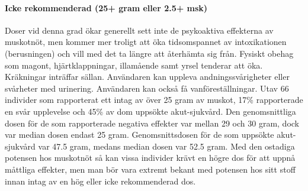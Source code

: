 \paragraph{Icke rekommenderad (25+ gram eller 2.5+ msk)}
Doser vid denna grad ökar generellt sett inte de psykoaktiva effekterna av muskotnöt, men kommer mer troligt att öka tidsomspannet av intoxikationen (berusningen) och vill med det ta längre att återhämta sig från.
Fysiskt obehag som magont, hjärtklappningar, illamående samt yrsel tenderar att öka.
Kräkningar inträffar sällan.
Användaren kan uppleva andningssvårigheter eller svårheter med urinering. Användaren kan också få vanföreställningar.
Utav 66 individer som rapporterat ett intag av över 25 gram av muskot, 17\% rapporterade en svår upplevelse och 45\% av dom uppsökte akut-sjukvård.
Den genomsnittliga dosen för de som rapporterade negativa effekter var mellan 29 och 30 gram, dock var median dosen endast 25 gram. Genomsnittsdosen för de som uppsökte akut-sjukvård var 47.5 gram, medans median dosen var 52.5 gram. Med den ostadiga potensen hos muskotnöt så kan vissa individer krävt en högre dos för att uppnå måttliga effekter, men man bör vara extremt bekant med potensen hos sitt stoff innan intag av en hög eller icke rekommenderad dos.









